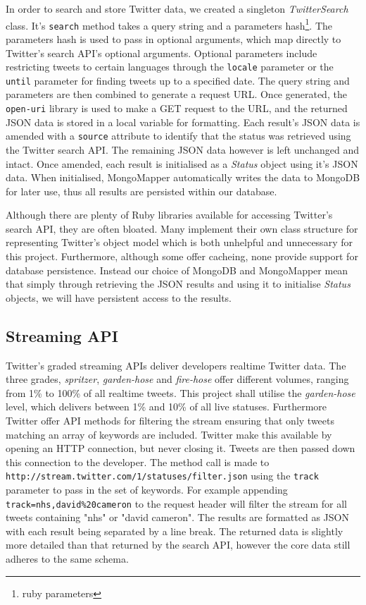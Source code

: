 In order to search and store Twitter data, we created a singleton \emph{TwitterSearch} class. It's \texttt{search} method takes a query string and a parameters hash\footnote{ruby parameters}. The parameters hash is used to pass in optional arguments, which map directly to Twitter's search API's optional arguments. Optional parameters include restricting tweets to certain languages through the \texttt{locale} parameter or the \texttt{until} parameter for finding tweets up to a specified date. The query string and parameters are then combined to generate a request URL. Once generated, the \texttt{open-uri} library is used to make a GET request to the URL, and the returned JSON data is stored in a local variable for formatting. Each result's JSON data is amended with a \texttt{source} attribute to identify that the status was retrieved using the Twitter search API. The remaining JSON data however is left unchanged and intact. Once amended, each result is initialised as a \emph{Status} object using it's JSON data. When initialised, MongoMapper automatically writes the data to MongoDB for later use, thus all results are persisted within our database.

Although there are plenty of Ruby libraries available for accessing Twitter's search API, they are often bloated. Many implement their own class structure for representing Twitter's object model which is both unhelpful and unnecessary for this project. Furthermore, although some offer cacheing, none provide support for database persistence. Instead our choice of MongoDB and MongoMapper mean that simply through retrieving the JSON results and using it to initialise \emph{Status} objects, we will have persistent access to the results. 

\subsection{Streaming API}

Twitter's graded streaming APIs deliver developers realtime Twitter data. The three grades, \emph{spritzer}, \emph{garden-hose} and \emph{fire-hose} offer different volumes, ranging from 1\% to 100\% of all realtime tweets. This project shall utilise the \emph{garden-hose} level, which delivers between 1\% and 10\% of all live statuses. Furthermore Twitter offer API methods for filtering the stream ensuring that only tweets matching an array of keywords are included. Twitter make this available by opening an HTTP connection, but never closing it. Tweets are then passed down this connection to the developer. The method call is made to \texttt{http://\-stream\-.twitter\-.com\-/1\-/statuses\-/fi\-l\-ter\-.json} using the \texttt{track} parameter to pass in the set of keywords. For example appending \texttt{track=nhs,david\%20cameron} to the request header will filter the stream for all tweets containing "nhs" or "david cameron". The results are formatted as JSON with each result being separated by a line break. The returned data is slightly more detailed than that returned by the search API, however the core data still adheres to the same schema.

